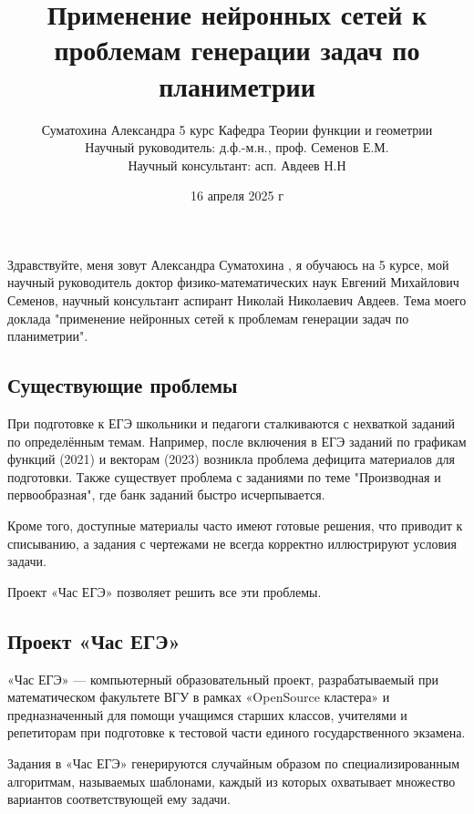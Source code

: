 \documentclass[a4paper, 12pt]{extarticle}
\title{Применение нейронных сетей к проблемам генерации
задач по планиметрии}
\author{Суматохина Александра 5 курс Кафедра Теории функции и геометрии\\Научный руководитель: д.ф.-м.н., проф. Семенов Е.М.\\Научный консультант: асп. Авдеев Н.Н}
\date{16 апреля 2025 г}
\begin{document}
\maketitle

Здравствуйте, меня зовут Александра Суматохина , я обучаюсь на 5 курсе, мой научный руководитель доктор физико-математических наук Евгений Михайлович Семенов, научный консультант аспирант Николай Николаевич Авдеев. Тема моего доклада "применение нейронных сетей к проблемам генерации задач по планиметрии".

\subsection*{Существующие проблемы}
При подготовке к ЕГЭ школьники и педагоги сталкиваются с нехваткой заданий по определённым темам. Например, после включения в ЕГЭ заданий по графикам функций (2021) и векторам (2023) возникла проблема дефицита материалов для подготовки. Также существует проблема с заданиями по теме "Производная и первообразная", где банк заданий быстро исчерпывается.

Кроме того, доступные материалы часто имеют готовые решения, что приводит к списыванию, а задания с чертежами не всегда корректно иллюстрируют условия задачи.

Проект «Час ЕГЭ» позволяет решить все эти проблемы.

\subsection*{Проект «Час ЕГЭ»}
«Час ЕГЭ» — компьютерный образовательный проект, разрабатываемый при математическом
факультете ВГУ в рамках «OpenSource кластера» и предназначенный для помощи учащимся
старших классов, учителями и репетиторам при подготовке к тестовой части единого государственного экзамена.

Задания в «Час ЕГЭ» генерируются случайным образом по специализированным алгоритмам, называемых шаблонами, каждый из которых охватывает множество вариантов соответствующей ему задачи.

\end{document}

